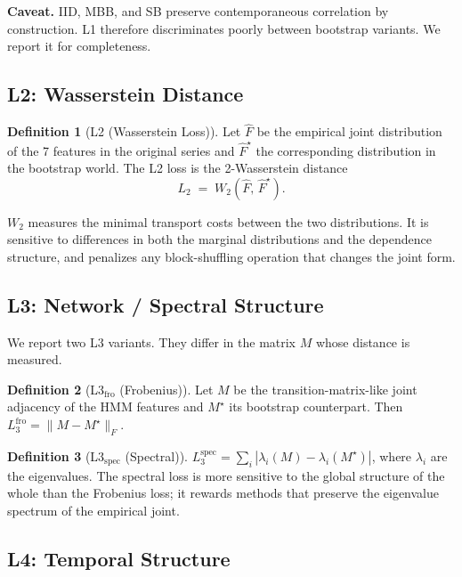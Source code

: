 \documentclass[11pt,a4paper]{article}
\theoremstyle{definition}
\newtheorem{definition}{Definition}
\begin{document}
\textbf{Caveat.} IID, MBB, and SB preserve contemporaneous correlation by construction. L1 therefore discriminates poorly between bootstrap variants. We report it for completeness.

\subsection{L2: Wasserstein Distance}

\begin{definition}[L2 (Wasserstein Loss)]
Let $\hat{F}$ be the empirical joint distribution of the 7 features in the original series and $\hat{F}^{\star}$ the corresponding distribution in the bootstrap world. The L2 loss is the 2-Wasserstein distance
\[
L_2 \;=\; W_2(\hat{F},\, \hat{F}^{\star}).
\]
\end{definition}

$W_2$ measures the minimal transport costs between the two distributions. It is sensitive to differences in both the marginal distributions and the dependence structure, and penalizes any block-shuffling operation that changes the joint form.

\subsection{L3: Network / Spectral Structure}

We report two L3 variants. They differ in the matrix $M$ whose distance is measured.

\begin{definition}[L3$_{\text{fro}}$ (Frobenius)]
Let $M$ be the transition-matrix-like joint adjacency of the HMM features and $M^{\star}$ its bootstrap counterpart. Then $L_3^{\text{fro}} = \|M - M^{\star}\|_F$.
\end{definition}

\begin{definition}[L3$_{\text{spec}}$ (Spectral)]
$L_3^{\text{spec}} = \sum_i |\lambda_i(M) - \lambda_i(M^{\star})|$, where $\lambda_i$ are the eigenvalues. The spectral loss is more sensitive to the global structure of the whole than the Frobenius loss; it rewards methods that preserve the eigenvalue spectrum of the empirical joint.
\end{definition}

\subsection{L4: Temporal Structure}
\end{document}
